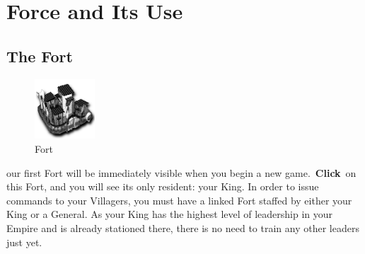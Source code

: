 
\chapter{Force and Its Use}


\section{The Fort}

\begin{figure}
	\vspace{-20pt}
	\begin{center}
		\includegraphics[width=0.2\textwidth]{Ifort}
		\\ Fort
	\end{center}
	\vspace{-10pt} %
	\end{figure}

our first Fort will be immediately visible when you begin a new game. \textbf{Click} on this Fort, and you will see its only resident: your King. In order to issue commands to your Villagers, you must have a linked Fort staffed by either your King or a General. As your King has the highest level of leadership in your Empire and is already stationed there, there is no need to train any other leaders just yet.

